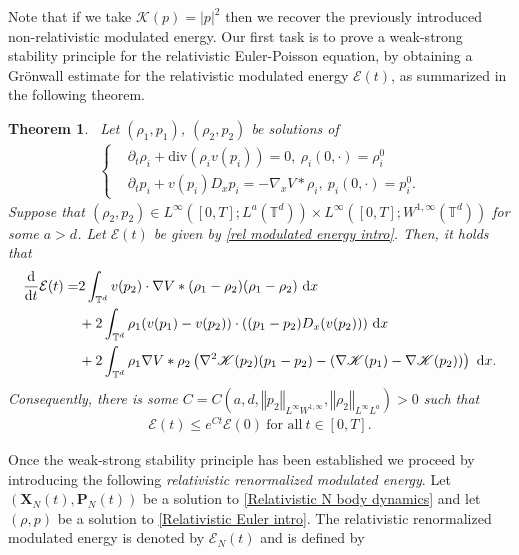 \documentclass[11pt,reqno]{amsart}
\newtheorem{thm}{Theorem}[section]
\numberwithin{equation}{section}
\def\dd{{\rm d}}
\begin{document}
Note that if we take $\mathscr{K}(p)=\left\vert p\right\vert^{2}$ then we recover the previously introduced non-relativistic modulated energy. Our first task is to prove a weak-strong stability principle for the relativistic Euler-Poisson equation, by obtaining a Gr\"onwall estimate for the relativistic modulated energy $\mathcal{E}(t)$, as summarized in the following theorem.  
\begin{thm} \
\label{weak strong stability intro}
Let $(\rho_{1},p_{1})$, $(\rho_{2},p_{2})$ be  solutions of 
\begin{align*}
\begin{cases}
&\partial_{t}\rho_{i}+\mathrm{div}(\rho_{i}v(p_{i}))=0, \ \rho_{i}(0,\cdot)=\rho_{i}^{0}\\
&\partial_{t}p_{i}+v(p_{i})D_{x}p_{i}=-\nabla_{x}V\ast \rho_{i},\ p_{i}(0,\cdot)=p_{i}^{0}. 
\end{cases}      
\end{align*}
Suppose that $(\rho_{2},p_{2})\in L^{\infty}([0,T];L^{a}(\mathbb{T}^{d}))\times L^{\infty}([0,T];W^{1,\infty}(\mathbb{T}^{d}))$ for some $a>d$. 
Let $\mathcal{E}(t)$ be given by \eqref{rel modulated energy intro}. Then, it holds that 
\begin{align}
\frac{\dd}{\dd t}\mathcal{E}(t)=&2\int_{\mathbb{T}^{d}} v(p_{2})\cdot \nabla V\ast (\rho_{1}-\rho_{2})(\rho_{1}-\rho_{2})\ \dd x \notag\\
&+2\int_{\mathbb{T}^{d}}\rho_{1}(v(p_{1})-v(p_{2}))\cdot ((p_{1}-p_{2})D_{x}(v(p_{2})))\ \dd x \notag\\
&+2\int_{\mathbb{T}^{d}}\rho_{1}\nabla V\ast \rho_{2}\left(\nabla^{2}\mathscr{K}(p_{2})(p_{1}-p_{2})-(\nabla \mathscr{K}(p_{1})-\mathscr{\nabla}\mathscr{K}(p_{2}))\right)\ \dd x. 
\label{statement of formula for der of H}
\end{align}
Consequently, there is some $C=C(a,d,\left\Vert p_{2}\right\Vert_{L^{\infty}W^{1,\infty}}, \left\Vert \rho_{2}\right\Vert_{L^{\infty}L^{a}})>0$ such that 
\begin{align}
\mathcal{E}(t)\leq e^{Ct}\mathcal{E}(0)\ \mbox{for all}\ t\in [0,T]. \label{statement of est on H}   \end{align}
\end{thm}
Once the weak-strong stability principle has been established we proceed by introducing the following \textit{relativistic renormalized modulated energy}. Let $(\mathbf{X}_{N}(t),\mathbf{P}_{N}(t))$ be a solution to \eqref{Relativistic N body dynamics} and let $(\rho,p)$ be a solution to \eqref{Relativistic Euler intro}. The relativistic renormalized modulated energy is denoted by $\mathcal{E}_{N}(t)$ and is defined by 
\end{document}
